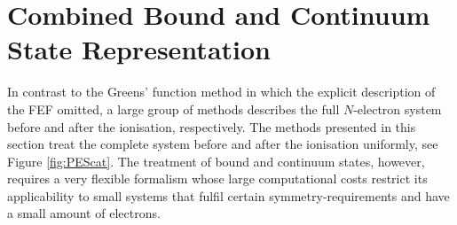 %
\section{Combined Bound and Continuum State Representation}
\label{ch:r-mat}
In contrast to the Greens' function method in which the explicit description of the FEF  omitted, a large group of methods describes the full $N$-electron system before and after the ionisation, respectively.
The methods presented in this section treat the complete system before and after the ionisation uniformly, see Figure \ref{fig:PEScat}.
The treatment of bound and continuum states, however, requires a very flexible formalism whose large computational costs restrict its applicability to small systems that fulfil certain symmetry-requirements and have a small amount of electrons.

